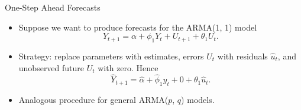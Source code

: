 %
%
\begin{frame}{One-Step Ahead Forecasts}
\begin{itemize}
\item Suppose we want to produce forecasts for the ARMA(1, 1) model
\[
Y_{t+1}=\alpha +\phi _{1}Y_{t}+U_{t+1}+\theta_{1}U_{t}.
\]
\item Strategy: replace parameters with estimates, errors $U_t$ with residuals $\hat{u}_t$, and unobserved future $U_t$ with zero. Hence
\[
\widehat{Y}_{t+1}=\hat\alpha +\hat{\phi }_{1}y_{t}+0+\theta_{1}\hat{u}_{t}.
\]
\item Analogous procedure for general ARMA($p$, $q$) models.
\end{itemize}
\end{frame}
